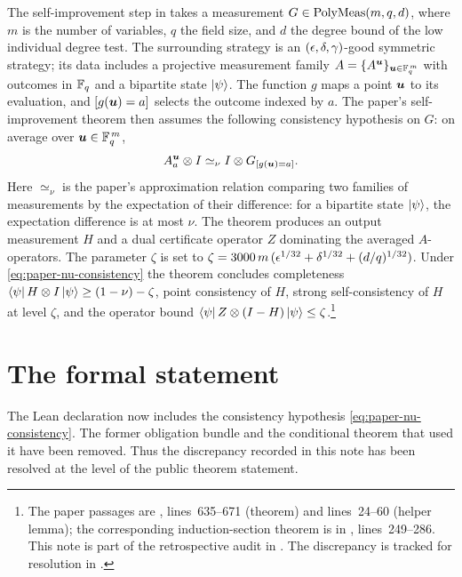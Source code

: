 \documentclass{article}
\begin{document}
The self-improvement step in \cite[Section~9]{Ji2020LowIndividualDegree}
takes a measurement $G\in\mathrm{PolyMeas}(m, q, d)$, where $m$ is the number
of variables, $q$ the field size, and $d$ the degree bound of the
low individual degree test.  The surrounding strategy is an
$(\epsilon,\delta,\gamma)$-good symmetric strategy; its data includes a
projective measurement family $A=\{A^{\boldsymbol{u}}\}_{\boldsymbol{u}\in\mathbb{F}_q^{\,m}}$ with
outcomes in $\mathbb{F}_q$ and a bipartite state $\ket\psi$.  The function $g$
maps a point $\boldsymbol{u}$ to its evaluation, and $[g(\boldsymbol{u})=a]$ selects the outcome
indexed by $a$.  The paper's self-improvement theorem then assumes the
following consistency hypothesis on $G$: on average over $\boldsymbol{u}\in\mathbb{F}_q^{\,m}$,
\begin{equation}
  \label{eq:paper-nu-consistency}
  A_a^{\boldsymbol{u}}\otimes I \simeq_{\nu} I \otimes G_{[g(\boldsymbol{u})=a]}.
\end{equation}
Here $\simeq_{\nu}$ is the paper's approximation relation comparing two
families of measurements by the expectation of their difference: for a
bipartite state $\ket\psi$, the expectation difference is at most $\nu$.
The theorem produces an output measurement $H$ and a dual certificate
operator $Z$ dominating the averaged $A$-operators.
The parameter $\zeta$ is set to
$\zeta = 3000\,m\,(\epsilon^{1/32}+\delta^{1/32}+(d/q)^{1/32})$.
Under \eqref{eq:paper-nu-consistency} the theorem concludes completeness
$\bra\psi H\otimes I\ket\psi \ge (1-\nu)-\zeta$, point consistency of $H$,
strong self-consistency of $H$ at level $\zeta$, and the operator bound
$\bra\psi Z\otimes(I-H)\ket\psi \le \zeta$.\footnote{The paper passages are
, lines~635--671 (theorem)
and lines~24--60 (helper lemma); the corresponding induction-section theorem is in
, lines~249--286. This note
is part of the retrospective audit in . The discrepancy is
tracked for resolution in .}

\section{The formal statement}

The Lean declaration 
now includes the consistency hypothesis
\eqref{eq:paper-nu-consistency}.  The former obligation bundle
 and the conditional theorem that used it
have been removed.  Thus the discrepancy recorded in this note has been
resolved at the level of the public theorem statement.
\end{document}
